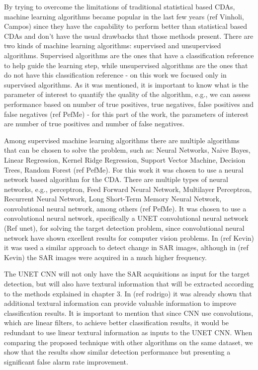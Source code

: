 By trying to overcome the limitations of traditional statistical based CDAs, machine learning algorithms became popular in the last few years (ref Vinholi, Campos) since they
have the capability to perform better than statistical based CDAs and don't have the usual drawbacks that those methods present. There are two kinds of machine learning algorithms: supervised and unsupervised
algorithms. Supervised algorithms are the ones that have a  classification reference to help guide the learning step, while unsupervised algorithms are the ones that do not have this classification reference - 
on this work we focused only in supervised algorithms. As it was mentioned, it is important to know what is the parameter of interest to quantify the quality of the algorithm, e.g., we can assess performance
based on number of true positives, true negatives, false positives and false negatives (ref PefMe) - for this part of the work, the parameters of interest are number of true positives and number of false negatives.

Among supervised machine learning algorithms there are multiple algorithms that can be chosen to solve the problem, such as: Neural Networks, Naive Bayes, Linear Regression, Kernel Ridge Regression, Support Vector Machine, Decision Trees, Random Forest (ref PefMe).
For this work it was chosen to use a neural network based algorithm for the CDA. There are multiple types of neural networks, e.g., perceptron, Feed Forward Neural Network, Multilayer Perceptron, Recurrent Neural Network, Long Short-Term Memory Neural Network, convolutional
neural network, among others (ref PefMe). It was chosen to use a convolutional neural network, specifically a UNET convolutional neural network (Ref unet), for solving the target detection problem, since convolutional neural network have shown
excellent results for computer vision problems. In (ref Kevin) it was used a similar approach to detect change in SAR images, although in (ref Kevin) the SAR images were acquired in a much higher frequency. 
  
The UNET CNN will not only have the SAR acquisitions as input for the target detection, but will also have textural information that will be extracted according to the methods explained in 
chapter 3. 
In (ref rodrigo) it was already shown that additional textural information can provide valuable information to improve classification results. It is important to mention that since CNN use convolutions, which are linear filters, to achieve better classification results,
it would be redundant to use linear textural information as inputs to the UNET CNN.  When comparing the proposed technique with other algorithms on the same dataset, we show that the results show similar detection performance but presenting a significant false alarm rate improvement.

